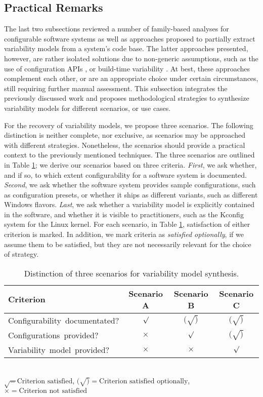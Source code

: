 \subsection{Practical Remarks}
The last two subsections reviewed a number of family-based analyses for
configurable software systems as well as approaches proposed to partially
extract variability models from a system’s code base. The latter approaches
presented, however, are rather isolated solutions due to non-generic
assumptions, such as the use of configuration APIs \citep{rabkin_static_2011},
or build-time variability \citep{nadi_where_2015}. At best, these approaches
complement each other, or are an appropriate choice under certain
circumstances, still requiring further manual assessment. This subsection
integrates the previously discussed work and proposes methodological strategies
to synthesize variability models for different scenarios, or use cases.

For the recovery of variability models, we propose three scenarios. The
following distinction is neither complete, nor exclusive, as scenarios may be
approached with different strategies. Nonetheless, the scenarios should provide
a practical context to the previously mentioned techniques. The three
scenarios are outlined in Table \ref{tab:synthesis}; we derive our scenarios
based on three criteria. \emph{First}, we ask whether, and if so, to which
extent configurability for a software system is documented. \emph{Second}, we ask
whether the software system provides sample configurations, such as configuration presets, or whether it ships as different variants, such as
different Windows flavors. \emph{Last}, we ask whether a variability model is
explicitly contained in the software, and whether it is visible to
practitioners, such as the Kconfig system for the Linux kernel. For each
scenario, in Table \ref{tab:synthesis}, satisfaction of either criterion is
marked. In addition, we mark criteria as \emph{satisfied optionally}, if we
assume them to be satisfied, but they are not necessarily relevant for the
choice of strategy.

\begin{table} 
	\centering
	\begin{tabular}{lccc}%
	\toprule
	\textbf{Criterion} & \textbf{Scenario A} & \textbf{Scenario B} &
	\textbf{Scenario C}
	\\
	\midrule
	\mbox{Configurability documentated?} & $\surd$ & $(\surd)$ & $(\surd)$ \\
	\mbox{Configurations provided?} & $\times$ & $\surd$ & $(\surd)$ \\
	\mbox{Variability model provided?} & $\times$ & $\times$ & $\surd$ \\
	\bottomrule
	\end{tabular}\\
	\vspace{1mm}
	{\footnotesize $\surd = \text{Criterion satisfied}$, $(\surd) =
	\text{Criterion satisfied optionally}$, $\times = \text{Criterion not
	satisfied}$}
	\caption{Distinction of three scenarios for variability model synthesis. }
	\label{tab:synthesis}
\end{table}

